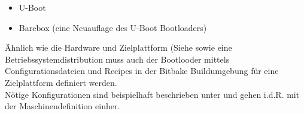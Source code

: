 \begin{itemize}
    \item U-Boot
    \item Barebox (eine Neuauflage des U-Boot Bootloaders)
\end{itemize}

Ähnlich wie die Hardware und Zielplattform (Siehe  sowie eine
Betriebssystem\-distribution muss auch der Bootlooder mittels
Configurationsdateien und Recipes in der Bitbake Buildumgebung für eine
Zielplattform definiert werden.
\\
Nötige Konfigurationen sind beispielhaft beschrieben unter \cite[93-95, 98-99,
100-108]{Gonzalez2018:Embedded_Linux_Development_Using_Yocto_Project_Cookbook_2nd}
und gehen i.d.R. mit der Maschinendefinition einher.
